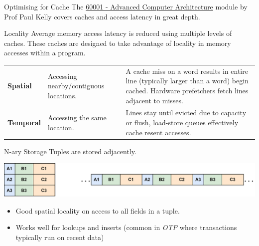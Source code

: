 \begin{sidenotebox}{Optimising for Cache}
    The \href{\ACAURL}{60001 - Advanced Computer Architecture} module by Prof Paul Kelly covers caches and access latency in great depth.
\end{sidenotebox}
\begin{definitionbox}{Locality}
    Average memory access latency is reduced using multiple levels of caches. These caches are designed to take advantage of locality in memory accesses within a program.
    \begin{center}
        \begin{tabular}{l p{} p{}}
            \textbf{Spatial} & Accessing nearby/contiguous locations. & A cache miss on a word results in entire line (typically larger than a word) begin cached. Hardware prefetchers fetch lines adjacent to misses. \\ 
            \textbf{Temporal} & Accessing the same location. & Lines stay until evicted due to capacity or flush, load-store queues effectively cache resent accesses. \\
        \end{tabular}
    \end{center}
\end{definitionbox}


\begin{definitionbox}{N-ary Storage}
    Tuples are stored adjacently.
    \begin{center}
        \includegraphics[width=.8\textwidth]{storage/images/nary_layout.drawio.png}
    \end{center}
    \begin{itemize}
        \item Good spatial locality on access to all fields in a tuple.
        \item Works well for lookups and inserts (common in \textit{OTP} where transactions typically run on recent data)
    \end{itemize}
\end{definitionbox}


